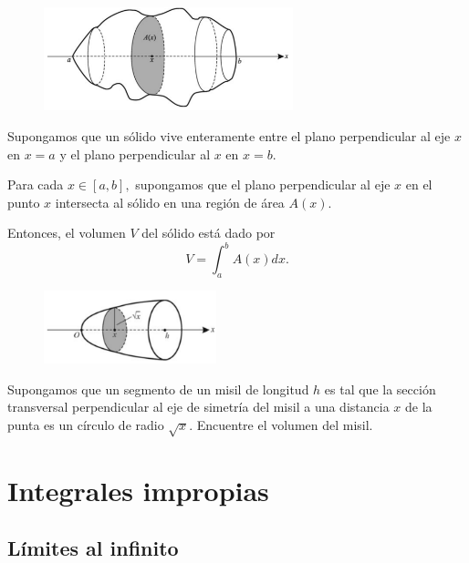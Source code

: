 \begin{figure}
 \centering
 \includegraphics[height=3cm,keepaspectratio=true]{./calculo/fig3008.png}
 \label{fig:3008}
\end{figure}


Supongamos que un s\'olido vive enteramente entre el plano perpendicular al eje $x$ en $x=a$ y el plano perpendicular al  $x$ en $x=b.$

Para cada $x\in [a,b],$ supongamos que el plano perpendicular al eje $x$ en el punto $x$ intersecta al s\'olido en una regi\'on de área $A(x).$



Entonces, el volumen $V$ del s\'olido está dado por
\[
 \label{fst}
 \tag{FST}
 V=\int_{a}^{b}A(x)dx.
\]


\begin{resuelto}
\begin{figure}
 \centering
 \includegraphics[width=5cm,keepaspectratio=true]{./calculo/fig3009.png}
 \label{fig:3009}
\end{figure}

 Supongamos que un segmento de un misil de longitud $h$ es tal que la secci\'on transversal perpendicular al eje de simetr\'ia del misil a una distancia $x$ de la punta  es un c\'irculo de radio $\sqrt{x}.$ Encuentre el volumen del misil.
\end{resuelto}



\section{Integrales impropias}

\subsection{L\'imites al infinito}


